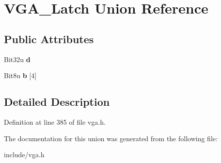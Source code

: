 \hypertarget{unionVGA__Latch}{\section{V\-G\-A\-\_\-\-Latch Union Reference}
\label{unionVGA__Latch}
}
\subsection*{Public Attributes}
\begin{DoxyCompactItemize}
\item 
\hypertarget{unionVGA__Latch_a68ae346aa35c3835ad2b7c988e9b53e6}{Bit32u {\bfseries d}}\label{unionVGA__Latch_a68ae346aa35c3835ad2b7c988e9b53e6}

\item 
\hypertarget{unionVGA__Latch_a2c3c0ab6db68a5db80e2f71639b089e1}{Bit8u {\bfseries b} \mbox{[}4\mbox{]}}\label{unionVGA__Latch_a2c3c0ab6db68a5db80e2f71639b089e1}

\end{DoxyCompactItemize}


\subsection{Detailed Description}


Definition at line 385 of file vga.\-h.



The documentation for this union was generated from the following file\-:\begin{DoxyCompactItemize}
\item 
include/vga.\-h\end{DoxyCompactItemize}
